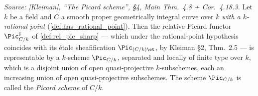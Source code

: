\begin{theorem}
  \label{thm:fga_pic_representability}
  \textit{Source: [Kleiman], ``The Picard scheme'', \S 4, Main Thm.~4.8
  + Cor.~4.18.3.}
  Let \(k\) be a field and \(C\) a smooth proper geometrically integral curve
  over \(k\) \emph{with a \(k\)-rational point}
  (\cref{def:has_rational_point}). Then the relative Picard functor
  \(\Pic^\sharp_{C/k}\) of \cref{def:rel_pic_sharp} --- which under the
  rational-point hypothesis coincides with its \'etale sheafification
  \(\Pic_{(C/k)\et}\), by Kleiman \S 2, Thm.~2.5 --- is representable by a
  \(k\)-scheme \(\Pic_{C/k}\), separated and locally of finite type over
  \(k\), which is a disjoint union of open quasi-projective
  \(k\)-subschemes, each an increasing union of open quasi-projective
  subschemes. The scheme \(\Pic_{C/k}\) is called the \emph{Picard scheme}
  of \(C/k\).
\end{theorem}

